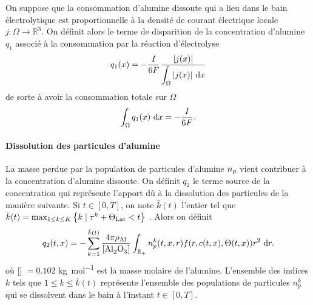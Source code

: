 On suppose que la consommation d'alumine dissoute qui a lieu dans le
bain électrolytique est proportionnelle à la densité de courant
électrique locale $j:\Omega\to\mathbb R^3$. On définit alors le terme
de disparition de la concentration d'alumine $q_1$ associé à la
consommation par la réaction d'électrolyse
\begin{equation}
  q_1(x) = -\frac{I}{6\faraday} %
  \frac{\abs{j(x)}}{\displaystyle\int_\Omega\abs{j(x)}\intd{x}}
\end{equation}
de sorte à avoir la consommation totale sur $\Omega$
\begin{equation}
  \int_\Omega q_1(x)\,\,\mathrm dx = -\frac{I}{6F}.
\end{equation}

\paragraph{Dissolution des particules d'alumine}
La masse perdue par la population de particules d'alumine
$n_p$ vient contribuer à la concentration d'alumine
dissoute. On définit $q_2$ le terme source de la concentration
qui représente l'apport dû à la dissolution des particules de la
manière suivante. Si $t \in [0, T]$, on note $\bar k(t)$ l'entier tel
que $\bar k(t) = \max_{1\leq k\leq K}\left\{ k \mid \tau^k + \Theta_\text{Lat} < t \right\}$ . Alors on définit
\begin{equation}
  q_2(t, x) = -\sum_{k = 1}^{\bar
    k(t)}\frac{4\pi\aluminadensity}{[\ce{Al2O3}]}\int_{\rplus}n_p^k(t,
  x, r)f(r, \concentration(t, x), \temperature(t, x))r^2\,\intd{r}.
\end{equation}
où [] $ = \num{0.102}$ \si{\kilo\gram\per\mol} est la masse
molaire de l'alumine. L'ensemble des indices $k$ tels que $1\leq k
\leq \bar k(t)$ représente l'ensemble des populations de particules
$n_p^k$ qui se dissolvent dans le bain à l'instant $t\in[0, T]$.

